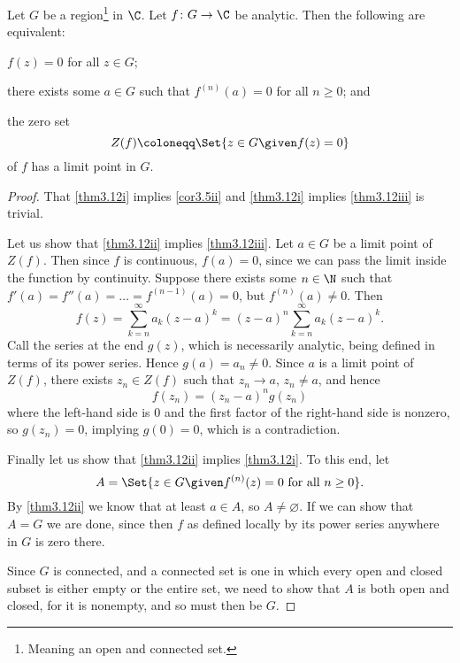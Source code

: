 \begin{theorem}\label{thm3.12}
	Let $G$ be a region\footnote{Meaning an open and connected set.}  in $\C$.
	Let $f \colon G \to \C$ be analytic.
	Then the following are equivalent:
	\begin{items}
		\item\label{thm3.12i} $f(z) = 0$ for all $z \in G$;
		\item\label{thm3.12ii} there exists some $a \in G$ such that $f^{(n)}(a) = 0$ for all $n \geq 0$; and
		\item\label{thm3.12iii} the zero set
		\[
			Z(f) \coloneqq \Set{z \in G \given f(z) = 0}
		\]
		of $f$ has a limit point in $G$.
	\end{items}
\end{theorem}

\begin{proof}
	That \ref{thm3.12i} implies \ref{cor3.5ii} and \ref{thm3.12i} implies \ref{thm3.12iii} is trivial.

	Let us show that \ref{thm3.12ii} implies \ref{thm3.12iii}.
	Let $a \in G$ be a limit point of $Z(f)$.
	Then since $f$ is continuous, $f(a) = 0$, since we can pass the limit inside the function by continuity.
	Suppose there exists some $n \in \N$ such that $f'(a) = f''(a) = \dots = f^{(n - 1)}(a) = 0$, but $f^{(n)}(a) \neq 0$.
	Then
	\[
		f(z) = \sum_{k = n}^\infty a_k (z - a)^k = (z - a)^n \sum_{k = n}^\infty a_k (z - a)^k.
	\]
	Call the series at the end $g(z)$, which is necessarily analytic, being defined in terms of its power series.
	Hence $g(a) = a_n \neq 0$.
	Since $a$ is a limit point of $Z(f)$, there exists $z_n \in Z(f)$ such that $z_n \to a$, $z_n \neq a$, and hence
	\[
		f(z_n) = (z_n - a)^n g(z_n)
	\]
	where the left-hand side is $0$ and the first factor of the right-hand side is nonzero, so $g(z_n) = 0$, implying $g(0) = 0$, which is a contradiction.

	Finally let us show that \ref{thm3.12ii} implies \ref{thm3.12i}.
	To this end, let
	\[
		A = \Set{z \in G \given f^{(n)}(z) = 0 \text{ for all } n \geq 0}.
	\]
	By \ref{thm3.12ii} we know that at least $a \in A$, so $A \neq \varnothing$.
	If we can show that $A = G$ we are done, since then $f$ as defined locally by its power series anywhere in $G$ is zero there.

	Since $G$ is connected, and a connected set is one in which every open and closed subset is either empty or the entire set, we need to show that $A$ is both open and closed, for it is nonempty, and so must then be $G$.


\end{proof}
